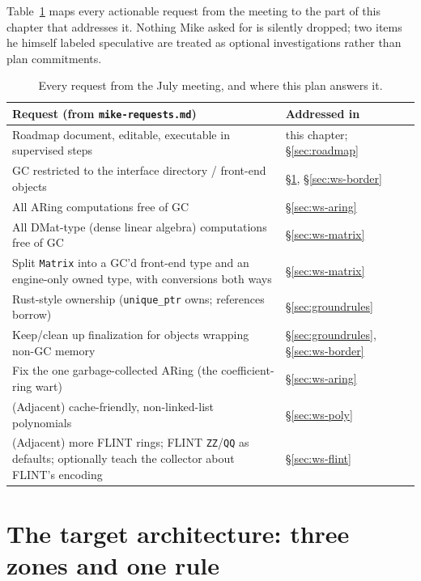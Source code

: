 \documentclass[11pt,oneside]{report}
\newcommand{\code}[1]{\textcolor{m2code}{\texttt{#1}}}
\newcommand{\file}[1]{\textcolor{m2file}{\texttt{#1}}}
\begin{document}
Table~\ref{tab:requests} maps every actionable request from the meeting to
the part of this chapter that addresses it. Nothing Mike asked for is
silently dropped; two items he himself labeled speculative are treated as
optional investigations rather than plan commitments.

\begin{table}[htbp]
\centering\small
{}
\begin{tabular}{@{}p{}l@{}}
\toprule
\textbf{Request (from \file{mike-requests.md})} & \textbf{Addressed in} \\
\midrule
Roadmap document, editable, executable in supervised steps
  & this chapter; \S\ref{sec:roadmap} \\
GC restricted to the interface directory / front-end objects
  & \S\ref{sec:target}, \S\ref{sec:ws-border} \\
All ARing computations free of GC
  & \S\ref{sec:ws-aring} \\
All DMat-type (dense linear algebra) computations free of GC
  & \S\ref{sec:ws-matrix} \\
Split \code{Matrix} into a GC'd front-end type and an engine-only owned type,
with conversions both ways
  & \S\ref{sec:ws-matrix} \\
Rust-style ownership (\code{unique\_ptr} owns; references borrow)
  & \S\ref{sec:groundrules} \\
Keep/clean up finalization for objects wrapping non-GC memory
  & \S\ref{sec:groundrules}, \S\ref{sec:ws-border} \\
Fix the one garbage-collected ARing (the coefficient-ring wart)
  & \S\ref{sec:ws-aring} \\
(Adjacent) cache-friendly, non-linked-list polynomials
  & \S\ref{sec:ws-poly} \\
(Adjacent) more FLINT rings; FLINT \code{ZZ}/\code{QQ} as defaults;
optionally teach the collector about FLINT's encoding
  & \S\ref{sec:ws-flint} \\
\bottomrule
\end{tabular}
\caption{Every request from the July meeting, and where this plan answers it.}
\label{tab:requests}
\end{table}

\section{The target architecture: three zones and one rule}
\label{sec:target}
\end{document}
